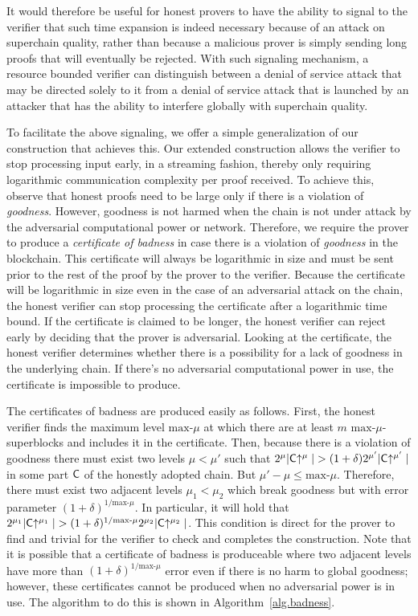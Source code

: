 It would therefore be useful for honest provers to have the ability to
signal to the verifier that such time expansion is indeed necessary because of
an attack on superchain quality, rather than because a malicious prover is
simply sending long proofs that will eventually be rejected. With such signaling
mechanism, a resource bounded verifier can distinguish between a denial of
service attack that may be directed solely to it from  a denial of service
attack that  is launched by an attacker that has the ability to  interfere
globally with superchain quality.

To facilitate the above signaling, we offer a simple generalization of our
construction that achieves this. Our extended construction allows the verifier
to stop processing input early, in a streaming fashion, thereby only requiring
logarithmic communication complexity per proof received. To achieve this,
observe that honest proofs need to be large only if there is a violation of
\emph{goodness}. However, goodness is not harmed when the chain is not under
attack by the adversarial computational power or network. Therefore, we require
the prover to produce a \emph{certificate of badness} in case there is a
violation of \emph{goodness} in the blockchain. This certificate will always
be logarithmic in size and must be sent prior to the rest of the proof by the
prover to the verifier. Because the certificate will be logarithmic in size even
in the case of an adversarial attack on the chain, the honest verifier can stop
processing the certificate after a logarithmic time bound. If the certificate is
claimed to be longer, the honest verifier can reject early by deciding that the
prover is adversarial. Looking at the certificate, the honest verifier
determines whether there is a possibility for a lack of goodness in the
underlying chain. If there's no adversarial computational power in use, the
certificate is impossible to produce.

The certificates of badness are produced easily as follows. First, the honest
verifier finds the maximum level $\text{max-}\mu$ at which there are at least
$m$ $\text{max-}\mu$-superblocks and includes it in the certificate. Then,
because there is a violation of goodness there must exist two levels $\mu <
\mu'$ such that $2^\mu|\mathsf{C}\negthickspace\uparrow^\mu| > (1 +
\delta)2^{\mu'}|\mathsf{C}\negthickspace\uparrow^{\mu'}|$ in some part $\mathsf{C}$ of the honestly
adopted chain. But $\mu' - \mu \leq \text{max-}\mu$. Therefore, there must exist
two adjacent levels $\mu_1 < \mu_2$ which break goodness but with error
parameter $(1 + \delta)^{1/{\text{max-}\mu}}$. In particular, it will hold that
$2^{\mu_1}|\mathsf{C}\negthickspace\uparrow^{\mu_1}| > (1 +
\delta)^{1/{\text{max-}\mu}}2^{\mu_2}|\mathsf{C}\negthickspace\uparrow^{\mu_2}|$. This condition
is direct for the prover to find and trivial for the verifier to check and
completes the construction. Note that it is possible that a certificate of
badness is produceable where two adjacent levels have more than $(1 +
\delta)^{1/{\text{max-}\mu}}$ error even if there is no harm to global goodness;
however, these certificates cannot be produced when no adversarial power is in
use. The algorithm to do this is shown in Algorithm~\ref{alg.badness}.


